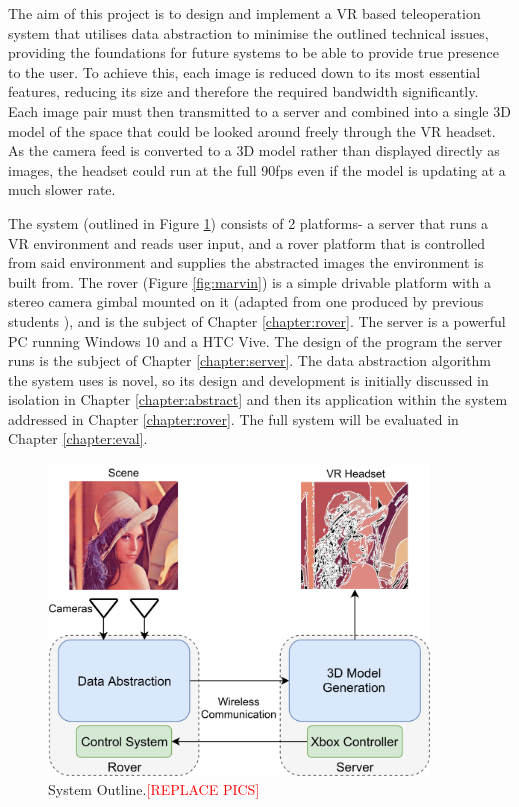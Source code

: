 The aim of this project is to design and implement a VR based teleoperation system that utilises data abstraction to minimise the outlined technical issues, providing the foundations for future systems to be able to provide true presence to the user. To achieve this, each image is reduced down to its most essential features, reducing its size and therefore the required bandwidth significantly. Each image pair must then transmitted to a server and combined into a single 3D model of the space that could be looked around freely through the VR headset. As the camera feed is converted to a 3D model rather than displayed directly as images, the headset could run at the full 90fps even if the model is updating at a much slower rate.

The system (outlined in Figure \ref{fig:outline}) consists of 2 platforms- a server that runs a VR environment and reads user input, and a rover platform that is controlled from said environment and supplies the abstracted images the environment is built from. The rover (Figure \ref{fig:marvin}) is a simple drivable platform with a stereo camera gimbal mounted on it (adapted from one produced by previous students \cite{gimble}), and is the subject of Chapter \ref{chapter:rover}. The server is a powerful PC running Windows 10 \cite{windows} and a HTC Vive. The design of the program the server runs is the subject of Chapter \ref{chapter:server}. The data abstraction algorithm the system uses is novel, so its design and development is initially discussed in isolation in Chapter \ref{chapter:abstract} and then its application within the system addressed in Chapter \ref{chapter:rover}. The full system will be evaluated in Chapter \ref{chapter:eval}.

\begin{figure}[H]
    \begin{center}
      \includegraphics[width=0.9\textwidth]{Figures/Outline.png}
      \caption[System Outline]{System Outline.\textcolor{red}{[REPLACE PICS]}}
      \label{fig:outline}
    \end{center}
\end{figure}

